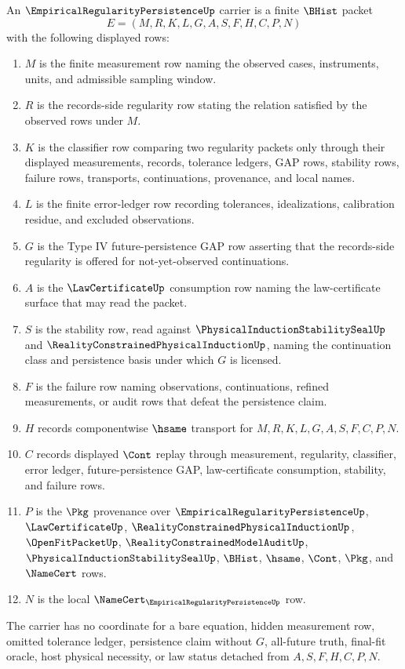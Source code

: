 \begin{definition}
\label{def:empirical-regularity-persistence-carrier}
An $\EmpiricalRegularityPersistenceUp$ carrier is a finite $\BHist$ packet
$$
E=(M,R,K,L,G,A,S,F,H,C,P,N)
$$
with the following displayed rows:
\begin{enumerate}
\item $M$ is the finite measurement row naming the observed cases, instruments, units, and admissible sampling window.
\item $R$ is the records-side regularity row stating the relation satisfied by the observed rows under $M$.
\item $K$ is the classifier row comparing two regularity packets only through their displayed measurements, records, tolerance ledgers, GAP rows, stability rows, failure rows, transports, continuations, provenance, and local names.
\item $L$ is the finite error-ledger row recording tolerances, idealizations, calibration residue, and excluded observations.
\item $G$ is the Type IV future-persistence GAP row asserting that the records-side regularity is offered for not-yet-observed continuations.
\item $A$ is the $\LawCertificateUp$ consumption row naming the law-certificate surface that may read the packet.
\item $S$ is the stability row, read against $\PhysicalInductionStabilitySealUp$ and $\RealityConstrainedPhysicalInductionUp$, naming the continuation class and persistence basis under which $G$ is licensed.
\item $F$ is the failure row naming observations, continuations, refined measurements, or audit rows that defeat the persistence claim.
\item $H$ records componentwise $\hsame$ transport for $M,R,K,L,G,A,S,F,C,P,N$.
\item $C$ records displayed $\Cont$ replay through measurement, regularity, classifier, error ledger, future-persistence GAP, law-certificate consumption, stability, and failure rows.
\item $P$ is the $\Pkg$ provenance over $\EmpiricalRegularityPersistenceUp$, $\LawCertificateUp$, $\RealityConstrainedPhysicalInductionUp$, $\OpenFitPacketUp$, $\RealityConstrainedModelAuditUp$, $\PhysicalInductionStabilitySealUp$, $\BHist$, $\hsame$, $\Cont$, $\Pkg$, and $\NameCert$ rows.
\item $N$ is the local $\NameCert_{\EmpiricalRegularityPersistenceUp}$ row.
\end{enumerate}
The carrier has no coordinate for a bare equation, hidden measurement row, omitted tolerance ledger, persistence claim without $G$, all-future truth, final-fit oracle, host physical necessity, or law status detached from $A,S,F,H,C,P,N$.
\end{definition}

